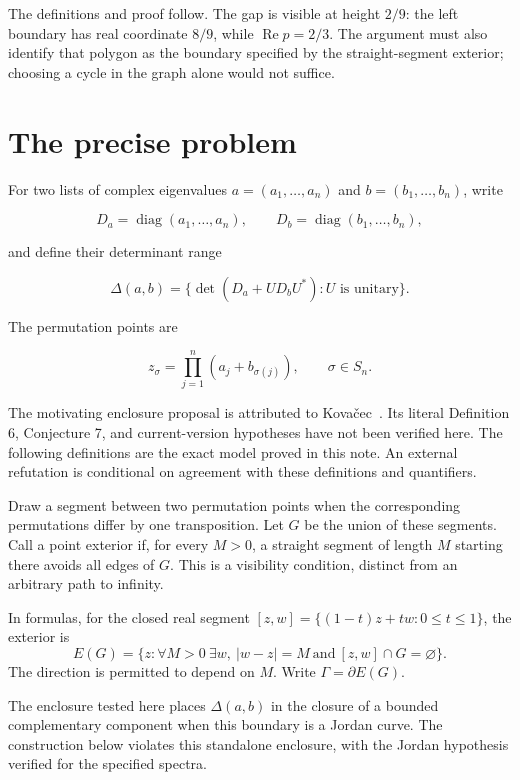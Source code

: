 \documentclass[11pt]{article}
\begin{document}
The definitions and proof follow. The gap is visible at height $2/9$: the left boundary has real coordinate $8/9$, while $\operatorname{Re}p=2/3$. The argument must also identify that polygon as the boundary specified by the straight-segment exterior; choosing a cycle in the graph alone would not suffice.

\section{The precise problem}\label{the-precise-problem}

For two lists of complex eigenvalues \(a=(a_1,\ldots,a_n)\) and
\(b=(b_1,\ldots,b_n)\), write

\[
D_a=\operatorname{diag}(a_1,\ldots,a_n),\qquad
D_b=\operatorname{diag}(b_1,\ldots,b_n),
\]

and define their determinant range

\[
\Delta(a,b)=\{\det(D_a+UD_bU^*):U\text{ is unitary}\}.
\]

The permutation points are

\[
z_\sigma=\prod_{j=1}^n(a_j+b_{\sigma(j)}),\qquad \sigma\in S_n.
\]

The motivating enclosure proposal is attributed to
Kova\v{c}ec~\cite{kovacec2026}. Its literal Definition 6, Conjecture 7,
and current-version hypotheses have not been verified here. The following
definitions are the exact model proved in this note. An external
refutation is conditional on agreement with these definitions and
quantifiers.

Draw a segment between two permutation points when the corresponding
permutations differ by one transposition. Let \(G\) be the union of
these segments. Call a point exterior if, for every \(M>0\), a straight
segment of length \(M\) starting there avoids all edges of \(G\).
This is a visibility condition, distinct from an arbitrary path to infinity.

In formulas, for the closed real segment $[z,w]=\{(1-t)z+tw:0\le t\le1\}$, the exterior is
\[
 E(G)=\{z:\forall M>0\ \exists w,\ |w-z|=M\ \text{and}\ [z,w]\cap G=\varnothing\}.
\]
The direction is permitted to depend on $M$. Write $\Gamma=\partial E(G)$.

The enclosure tested here places \(\Delta(a,b)\) in the closure of a
bounded complementary component when this boundary is a Jordan curve.
The construction below violates this standalone enclosure, with the
Jordan hypothesis verified for the specified spectra.
\end{document}
